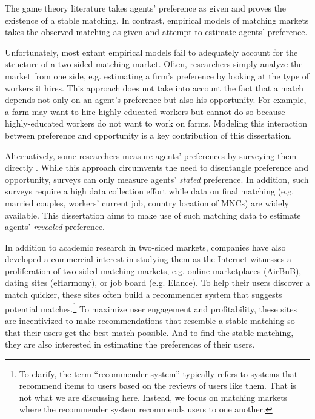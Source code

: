 The game theory literature takes agents' preference as given and proves the
existence of a stable matching. In contrast, empirical models of matching
markets takes the observed matching as given and attempt to estimate agents'
preference.

Unfortunately, most extant empirical models fail to adequately account for the
structure of a two-sided matching market. Often, researchers simply analyze the
market from one side, e.g. estimating a firm's preference by looking at the type
of workers it hires. This approach does not take into account the fact that a
match depends not only on an agent's preference but also his opportunity. For
example, a farm may want to hire highly-educated workers but cannot do so
because highly-educated workers do not want to work on farms. Modeling this
interaction between preference and opportunity is a key contribution of this
dissertation.

Alternatively, some researchers measure agents' preferences by surveying them
directly \citep{Posner2001, Sprecher1994}. While this approach circumvents the
need to disentangle preference and opportunity, surveys can only measure agents'
\textit{stated} preference. In addition, such surveys require a high data
collection effort while data on final matching (e.g. married couples, workers'
current job, country location of MNCs) are widely available. This dissertation
aims to make use of such matching data to estimate agents' \textit{revealed}
preference.

In addition to academic research in two-sided markets, companies have also
developed a commercial interest in studying them as the Internet witnesses a
proliferation of two-sided matching markets, e.g. online marketplaces (AirBnB),
dating sites (eHarmony), or job board (e.g. Elance). To help their users
discover a match quicker, these sites often build a recommender system that
suggests potential matches.\footnote{To clarify, the term ``recommender system''
  typically refers to systems that recommend items to users based on the reviews
  of users like them. That is not what we are discussing here. Instead, we focus
  on matching markets where the recommender system recommends users to one
  another.} To maximize user engagement and profitability, these sites are
incentivized to make recommendations that resemble a stable matching so that
their users get the best match possible. And to find the stable matching, they
are also interested in estimating the preferences of their users.

